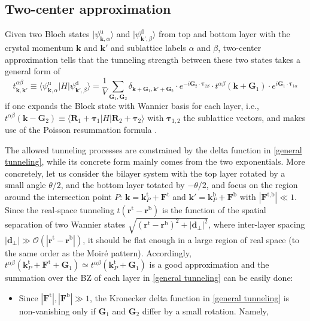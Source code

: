 \begin{subappendices}
	\section{Two-center approximation}
	Given two Bloch states $|\psi^\text{u}_{\bm{k},\alpha}\rangle$ and $|\psi^\text{d}_{\bm{k'},\beta}\rangle$ from top and bottom layer with the crystal momentum $\bm{k}$ and $\bm{k'}$ and sublattice labels $\alpha$ and $\beta$, two-center approximation \cite{bistritzer2011moire} tells that the tunneling strength between these two states takes a general form of \cite{catarina2019twisted}
	\begin{equation}\label{general tunneling}
		t^{\alpha\beta}_{\bm{k},\bm{k'}}\equiv\langle\psi^\text{u}_{\bm{k},\alpha}|H|\psi^\text{d}_{\bm{k'},\beta}\rangle=\dfrac{1}{V}\sum_{\bm{G}_1,\bm{G}_2}\delta_{\bm{k}+\bm{G}_1,\bm{k'}+\bm{G}_2}\cdot e^{-i\bm{G}_2\cdot\bm{\tau}_{2\beta}}\cdot t^{\alpha\beta}(\bm{k}+\bm{G}_1)\cdot e^{i\bm{G}_1\cdot\bm{\tau}_{1 \alpha}}
	\end{equation}
	if one expands the Block state with Wannier basis for each layer, i.e., $t^{\alpha\beta}(\bm{k}-\bm{G}_2)\equiv\langle\bm{R}_1+\bm{\tau}_1|H|\bm{R}_2+\bm{\tau}_2\rangle$ with $\bm{\tau}_{1,2}$ the sublattice vectors, and makes use of the Poisson resummation formula \cite{ledwith2021lecture}.\par
	The allowed tunneling processes are constrained by the delta function in \eqref{general tunneling}, while its concrete form mainly comes from the two exponentials. More concretely, let us consider the bilayer system with the top layer rotated by a small angle $\theta/2$, and the bottom layer totated by $-\theta/2$, and focus on the region around the intersection point $P$: $\bm{k}=\bm{k}_P^{\text{t}}+\bm{F}^{\text{t}}$ and $\bm{k'}=\bm{k}_P^{\text{b}}+\bm{F}^{\text{b}}$ with $|\bm{F}^{\text{t,b}}|\ll1$. Since the real-space tunneling $t(\bm{r}^{\text{t}}-\bm{r}^{\text{b}})$ is the function of the spatial separation of two Wannier states $\sqrt{(\bm{r}^{\text{t}}-\bm{r}^{\text{b}})^2+|\bm{d}_\perp|^2}$, where inter-layer spacing $|\bm{d}_\perp|\gg\mathcal{O}(|\bm{r}^{\text{t}}-\bm{r}^{\text{b}}|)$, it should be flat enough in a large region of real space (to the same order as the Moir\'{e} pattern). Accordingly, $t^{\alpha\beta}(\bm{k}_P^{\text{t}}+\bm{F}^{\text{t}}+\bm{G}_1)\simeq t^{\alpha\beta}(\bm{k}_P^{\text{t}}+\bm{G}_1)$ is a good approximation and the summation over the BZ of each layer in \eqref{general tunneling} can be easily done:
	\begin{itemize}
		\item Since $|\bm{F}^\text{t}|, |\bm{F}^\text{b}|\gg1$, the Kronecker delta function in \eqref{general tunneling} is non-vanishing only if $\bm{G}_1$ and $\bm{G}_2$ differ by a small rotation. Namely,

\end{itemize}
\end{subappendices}
